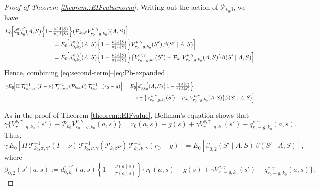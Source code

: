 \documentclass[11pt]{article}
\theoremstyle{plain}
\begin{document}
\begin{proof}[Proof of Theorem \ref{theorem::EIFvaluenorm}]
Writing out the action of $\mathcal{P}_{k_0\beta}$, we have
\begin{align}
E_0\!\Big[ d_{0,k_0}^{\pi,\gamma'}(A,S)\Bigl\{1 - &\tfrac{\nu(A \mid S)}{\pi(A \mid S)} \Bigr\}
          (\mathcal{P}_{k_0\beta} V_{r_0-g,k_0}^{\nu,\gamma})(A,S) \Big]  \notag \\
&=   E_0\!\Big[ d_{0,k_0}^{\pi,\gamma'}(A,S)\Bigl\{1 - \tfrac{\nu(A \mid S)}{\pi(A \mid S)} \Bigr\}
           V_{r_0-g, k_0}^{\nu,\gamma}(S') \,\beta(S' \mid A, S) \Big] \notag \\
&=   E_0\!\Big[ d_{0,k_0}^{\pi,\gamma'}(A,S)\Bigl\{1 - \tfrac{\nu(A \mid S)}{\pi(A \mid S)} \Bigr\}
           \bigl\{V_{r_0-g, k_0}^{\nu,\gamma}(S') - \mathcal{P}_{k_0}V_{r_0-g, k_0}^{\nu,\gamma}(A,S)\bigr\}
           \beta(S' \mid A, S) \Big].
\label{eq:Pb-expanded}
\end{align} 
Hence, combining \eqref{eq:second-term}–\eqref{eq:Pb-expanded},
\begin{align*}
 \gamma E_0\!\Big[  \Pi \,\mathcal{T}_{k_0,\pi,\gamma'}^{-1}(I - \nu)\,
            \mathcal{T}_{k_0,\nu,\gamma}^{-1}(\mathcal{P}_{k_0\beta} \nu)\,
            \mathcal{T}_{k_0,\nu,\gamma}^{-1}(r_0-g) \Big]
&=  E_0\!\Big[ d_{0,k_0}^{\pi,\gamma'}(A,S)\Bigl\{1-\tfrac{\nu(A \mid S)}{\pi(A \mid S)}   \Bigr\} \\
&\qquad \times \gamma \,\bigl\{V_{r_0-g, k_0}^{\nu,\gamma}(S') - \mathcal{P}_{k_0}V_{r_0-g, k_0}^{\nu,\gamma}(A,S)\bigr\}
                 \beta(S' \mid A, S) \Big].
\end{align*}


As in the proof of Theorem \ref{theorem::EIFvalue}, Bellman’s equation shows that 
\begin{equation*} 
\gamma \{V_{r_0-g, k_0}^{\nu,\gamma}(s') - \mathcal{P}_{k_0}V_{r_0-g, k_0}^{\nu,\gamma}(a,s)\} 
= r_0(a,s) - g(s) + \gamma V_{r_0-g, k_0}^{\nu,\gamma}(s') - q_{r_0-g, k_0}^{\nu,\gamma}(a,s).
\end{equation*}
Thus,
\begin{equation}
  \gamma\, E_0\!\left[ \Pi \,\mathcal{T}_{k_0,\pi,\gamma'}^{-1}(I - \nu)\,
  \mathcal{T}_{k_0,\nu,\gamma}^{-1}(\mathcal{P}_{k_0\beta} \nu)\,
  \mathcal{T}_{k_0,\nu,\gamma}^{-1}(r_0-g) \right] 
=  E_0\!\left[\beta_{0,2}(S' \mid A, S)\,\beta(S' \mid A, S) \right], \label{eqnproof::beta2}
\end{equation}
where
\[
\beta_{0,2}(s' \mid a, s) :=  d_{0,k_0}^{\pi,\gamma'}(a,s)\left\{1-\tfrac{\nu(a \mid s)}{\pi(a \mid s)}\right\}
\{r_0(a,s) - g(s) + \gamma V_{r_0-g, k_0}^{\nu,\gamma}(s') - q_{r_0-g, k_0}^{\nu,\gamma}(a,s)\}.
\]



\end{proof}
\end{document}
